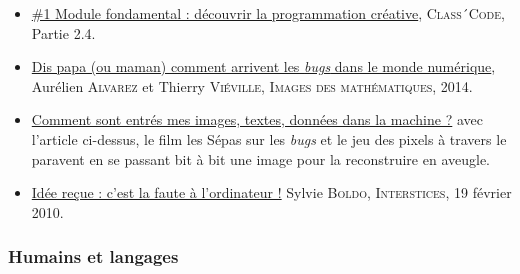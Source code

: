 \begin{gofurther}
\begin{itemize}\jazzitem
\item \href{https://pixees.fr/classcode/formations/module1/}{\#1 Module fondamental : découvrir la programmation créative}, \textsc{Class´Code}, Partie 2.4.
\end{itemize}

\vspace{2pt}
\begin{itemize}\jazzitem
\item \href{http://images.math.cnrs.fr/Dis-papa-ou-maman-comment-arrivent-les-bugs-dans-le-monde-numerique}{Dis papa (ou maman) comment arrivent les \textit{bugs} dans le monde numérique}, Aurélien \textsc{Alvarez} et Thierry \textsc{Viéville}, \textsc{Images des mathématiques}, 2014.
\item \href{https://pixees.fr/comment-sont-entrees-mes-images-textes-donnees-dans-la-machine/}{Comment sont entrés mes images, textes, données dans la machine ?} avec l'article ci-dessus, le film les Sépas sur les \textit{bugs} et le jeu des pixels à travers le paravent en se passant bit à bit une image pour la reconstruire en aveugle.
\item \href{https://interstices.info/idee-recue-cest-la-faute-a-lordinateur/}{Idée reçue : c’est la faute à l’ordinateur !} Sylvie \textsc{Boldo}, \textsc{Interstices}, 19 février 2010.
\end{itemize}
\end{gofurther}

\subsubsection[Humains et langages]{Humains et langages}
\label{subsub:VI.2.2.2}

